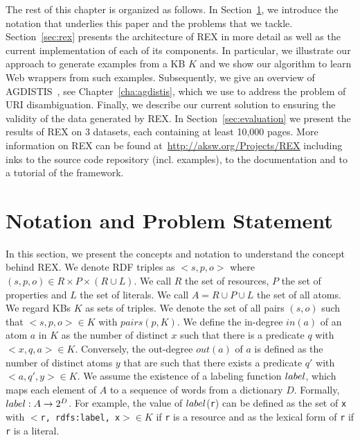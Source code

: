 The rest of this chapter is organized as follows. 
In Section~\ref{sec:notation}, we introduce the notation that underlies this paper and the problems that we tackle. 
Section~\ref{sec:rex} presents the architecture of REX in more detail as well as the current implementation of each of its components.
In particular, we illustrate our approach to generate examples from a  \ac{KB} $K$ and we show our algorithm to learn Web wrappers from such examples.
Subsequently, we give an overview of AGDISTIS~\cite{agdistis_iswc}, see Chapter~\ref{cha:agdistis}, which we use to address the problem of URI disambiguation. 
Finally, we describe our current solution to ensuring the validity of the data generated by REX. 
In Section~\ref{sec:evaluation} we present the results of REX on 3 datasets, each containing at least 10,000 pages. 
More information on REX can be found at~\url{http://aksw.org/Projects/REX} including inks to the source code repository (incl. examples), to the documentation and to a tutorial of the framework.

\section{Notation and Problem Statement}
\label{sec:notation}
In this section, we present the concepts and notation to understand the concept behind REX. We denote \ac{RDF} triples as $<s, p, o>$ where $(s, p, o) \in R \times P \times (R \cup L)$. We call $R$ the set of resources, $P$ the set of properties and $L$ the set of literals. We call $A = R \cup P \cup L$ the set of all atoms. We regard  \ac{KB}s $K$ as sets of triples. We denote the set of all pairs $(s, o)$ such that $<s, p, o> \in K$ with $pairs(p, K)$.
We define the in-degree $in(a)$ of an atom $a$ in $K$ as the number of distinct $x$ such that there is a predicate $q$ with $<x, q, a> \in K$. Conversely, the out-degree $out(a)$ of $a$ is defined as the number of distinct atoms $y$ that are such that there exists a predicate $q'$ with $<a, q', y> \in K$.
We assume the existence of a labeling function $label$, which maps each element of $A$ to a sequence of words from a dictionary $D$. Formally, $label: A \rightarrow 2^D$. For example, the value of $label$(\texttt{r}) can be defined as the set of \texttt{x} with $<$\texttt{r, rdfs:label, x}$> \in K$ if \texttt{r} is a resource and as the lexical form of  \texttt{r} if  \texttt{r} is a literal.

